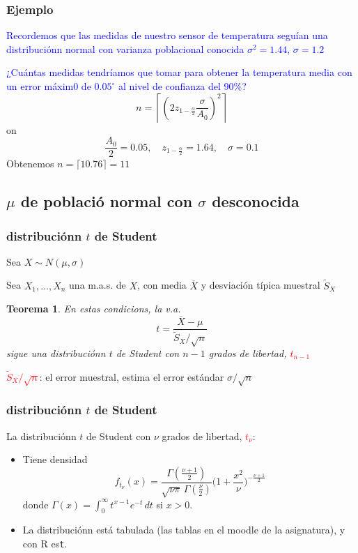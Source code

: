\documentclass[12pt,t]{beamer}\usepackage[]{graphicx}\usepackage[]{color}
\newcommand{\red}[1]{\textcolor{red}{#1}}
\newcommand{\blue}[1]{\textcolor{blue}{#1}}
\renewcommand{\emph}[1]{{\color{red}#1}}
\theoremstyle{plain}
\newtheorem{teorema}{Teorema}
\theoremstyle{definition}
\begin{document}
\begin{frame}
\frametitle{Ejemplo}

\blue{Recordemos  que las medidas de nuestro sensor  de temperatura seguían una distribuciónn normal con varianza poblacional conocida $\sigma^2=1.44$,  $\sigma=1.2$}
\medskip

\blue{¿Cuántas medidas tendríamos que tomar para obtener la  temperatura media  con un error máxim0 de $0.05^{\circ}$ al nivel de confianza del 90\%?}
$$
n=\left\lceil \left( 2 z_{1-\frac{\alpha}{2}}\frac{\sigma}{A_0}
\right)^2\right\rceil$$
on 
$$
\frac{A_0}{2}=0.05,\quad z_{1-\frac{\alpha}{2}}=1.64,\quad \sigma=0.1
$$
Obtenemos $n= \lceil10.76\rceil= 11$
\end{frame}



\subsection{$\mu$ de població normal con $\sigma$ desconocida}

\begin{frame}
\frametitle{distribuciónn $t$ de Student}


Sea $X\sim N(\mu,\sigma)$
\medskip

Sea $X_1,\ldots,X_n$ una m.a.s. de $X$, con media   $\overline{X}$ y desviación típica muestral $\widetilde{S}_{X}$
\medskip

\begin{teorema}
En estas condicions, la v.a.
$$
t=\frac{\overline{X}-\mu}{\widetilde{S}_{X}/\sqrt{n}}
$$
sigue una distribuciónn \emph{$t$ de Student} con $n-1$ grados de libertad, \red{$t_{n-1}$}
\end{teorema}
\medskip

\red{$\widetilde{S}_{X}/\sqrt{n}$}: el \emph{error muestral}, estima el error estándar $\sigma/\sqrt{n}$
\end{frame}



\begin{frame}
\frametitle{distribuciónn $t$ de Student}


La distribuciónn $t$ de Student con $\nu$ grados de libertad, \red{$t_{\nu}$}:
\medskip

\begin{itemize}
\item  Tiene  densidad
$$
f_{t_\nu}(x) = \frac{\Gamma(\frac{\nu+1}{2})} {\sqrt{\nu\pi}\,\Gamma(\frac{\nu}{2})} \Big(1+\frac{x^2}{\nu} \Big)^{-\frac{\nu+1}{2}}
$$
donde $\Gamma(x)=\int_{0}^{\infty} t^{x-1}e^{-t}\, dt$ si $x> 0$. 
\bigskip

\item La distribuciónn está tabulada (\emph{las tablas en el moodle de la asignatura}), y con R es\texttt{t}.
\end{itemize}
\end{frame}
\end{document}
